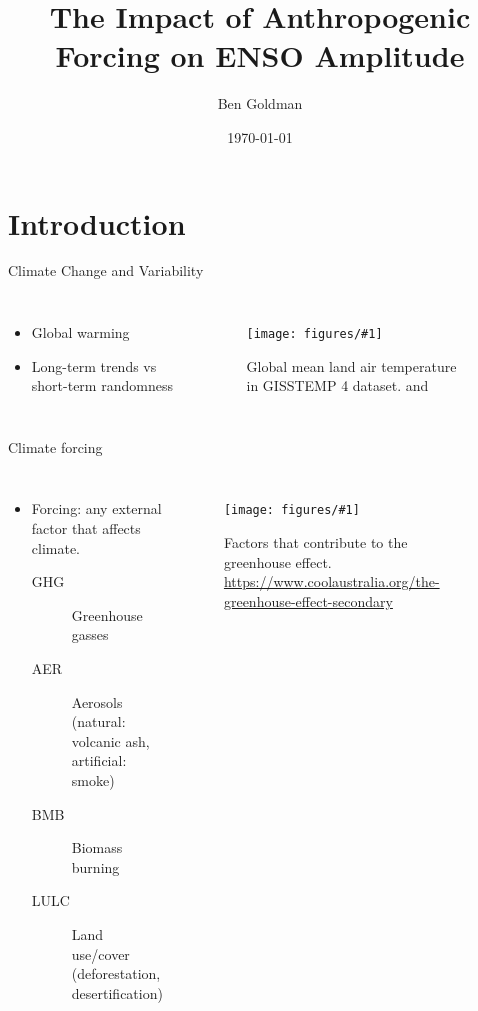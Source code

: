\documentclass{beamer}
\title{The Impact of Anthropogenic Forcing on ENSO Amplitude}
\author{Ben Goldman}
\date{\today}
\newcommand{\myfig}[3]{
  \begin{figure}
    \centering
    \texttt{[image: figures/\#1]}
    \caption{#2}
    \label{fig:#3}
  \end{figure}
}
\begin{document}
\maketitle

\section{Introduction}

\begin{frame}{Climate Change and Variability}
  \begin{columns}
    \begin{itemize}
    \item Global warming
    \item Long-term trends vs short-term randomness
    \end{itemize}
    \myfig{intro_fig_3.pdf}{Global mean land air temperature in GISSTEMP 4 dataset. \citep{gistemp2019giss} and \citep{lenssen2019improvements}}{this}
  \end{columns}
\end{frame}

\begin{frame}{Climate forcing}
  \begin{columns}
    \begin{itemize}
    \item \alert{Forcing}: any external factor that affects climate.
      \begin{description}
      \item[\alert{GHG}] Greenhouse gasses
      \item[\alert{AER}] Aerosols (natural: volcanic ash, artificial: smoke)
      \item[\alert{BMB}] Biomass burning
      \item[\alert{LULC}] Land use/cover (deforestation, desertification)
      \end{description}
    \end{itemize}
    \myfig{greenhouse_Effect.jpg}{Factors that contribute to the greenhouse effect. \url{https://www.coolaustralia.org/the-greenhouse-effect-secondary}}{this}
  \end{columns}
\end{frame}
\end{document}
